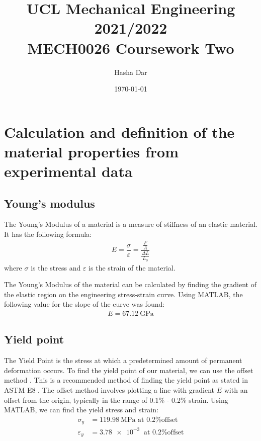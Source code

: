 \documentclass[11pt]{article}
\numberwithin{equation}{section}
\begin{document}
\title{\textbf{UCL Mechanical Engineering 2021/2022}\\MECH0026 Coursework Two}
\author{Hasha Dar}
\date{\today}
\maketitle
\tableofcontents
\newpage
\listoffigures
\newpage
\section{Calculation and definition of the material properties from experimental data}
\subsection{Young's modulus}
The Young's Modulus of a material is a measure of stiffness of an elastic material. It has the following formula:
\begin{gather}
    E = \dfrac{\sigma}{\varepsilon} = \dfrac{\frac{F}{A}}{\frac{\Delta L}{L_0}}
\end{gather}
where $\sigma$ is the stress and $\varepsilon$ is the strain of the material. 

The Young's Modulus of the material can be calculated by finding the gradient of the elastic region on the engineering stress-strain curve. Using MATLAB, the following value for the slope of the curve was found:
\begin{gather}
    E = \SI{67.12}{\giga\pascal}   
\end{gather}
\subsection{Yield point}
The Yield Point is the stress at which a predetermined amount of permanent deformation occurs. To find the yield point of our material, we can use the offset method \cite{b1}. This is a recommended method of finding the yield point as stated in ASTM E8 \cite{b2}. The offset method involves plotting a line with gradient $E$ with an offset from the origin, typically in the range of 0.1\% - 0.2\% strain. Using MATLAB, we can find the yield stress and strain:
\begin{align}
    \sigma_y &= \SI{119.98}{\mega\pascal} \textrm{ at 0.2\% offset}\\
    \varepsilon_y &= \SI{3.78e-3}{} \textrm{ at 0.2\% offset}
\end{align}
\end{document}
